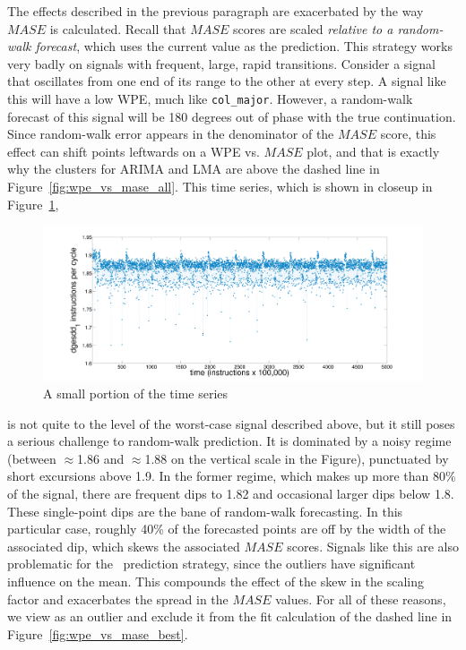 The effects described in the previous paragraph are exacerbated by the
way $MASE$ is calculated.  Recall that $MASE$ scores are scaled
\emph{relative to a random-walk forecast}, which uses the current
value as the prediction.  This strategy works very badly on signals
with frequent, large, rapid transitions.  Consider a signal that
oscillates from one end of its range to the other at every step.  A
signal like this will have a low WPE, much like {\tt col\_major}.
However, a random-walk forecast of this signal will be 180 degrees out
of phase with the true continuation.  Since random-walk error appears
in the denominator of the $MASE$ score, this effect can shift points
leftwards on a WPE vs. $MASE$ plot, and that is exactly why the
\svdone clusters for ARIMA and LMA are above the dashed line in
Figure~\ref{fig:wpe_vs_mase_all}.  This time series, which is shown in
closeup in Figure~\ref{fig:svdone-ts},
\begin{figure}[htbp]
  \centering
    \includegraphics[width=\columnwidth]{figs/svdonets2}
\caption{A small portion of the \svdone time series}\label{fig:svdone-ts}
\end{figure} 
is not quite to the level of the worst-case signal described above,
but it still poses a serious challenge to random-walk prediction.  It
is dominated by a noisy regime (between $\approx$1.86 and
$\approx$1.88 on the vertical scale in the Figure), punctuated by
short excursions above 1.9.  In the former regime, which makes up more
than 80\% of the signal, there are frequent dips to 1.82 and
occasional larger dips below 1.8.  These single-point dips are the
bane of random-walk forecasting.  In this particular case, roughly
40\% of the forecasted points are off by the width of the associated
dip, which skews the associated $MASE$ scores.  Signals like this are
also problematic for the \naive ~prediction strategy, since the
outliers have significant influence on the mean.  This compounds the
effect of the skew in the scaling factor and exacerbates the spread in
the \svdone $MASE$ values.  For all of these reasons, we view \svdone
as an outlier and exclude it from the fit calculation of the dashed
line in Figure~\ref{fig:wpe_vs_mase_best}.

